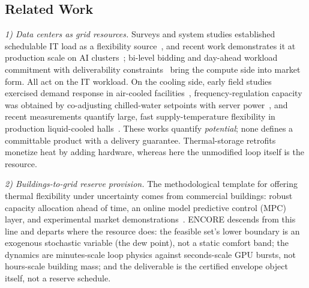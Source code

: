 \vspace{-4mm}
\subsection{Related Work}
\label{subsec:related}

\textit{1) Data centers as grid resources.} Surveys and system studies
established schedulable IT load as a flexibility
source~\cite{takci2025datacentres,wierman2014opportunities}, and recent work
demonstrates it at production scale on AI
clusters~\cite{colangelo2025phoenix,acun2026flexibility}; bi-level bidding and
day-ahead workload commitment with deliverability
constraints~\cite{chen2023bilevel,fan2026commitment} bring the compute side
into market form. All act on the IT workload. On the cooling side, early
field studies exercised demand response in air-cooled
facilities~\cite{ghatikar2012demand}, frequency-regulation capacity was
obtained by co-adjusting chilled-water setpoints with server
power~\cite{fu2020assessments}, and recent measurements quantify large, fast
supply-temperature flexibility in production liquid-cooled
halls~\cite{gheni2026liquid}. These works quantify \emph{potential}; none
defines a committable product with a delivery guarantee. Thermal-storage
retrofits~\cite{oh2025rtes,zhang2025carnot,ravi2026prosumer} monetize heat by
adding hardware, whereas here the unmodified loop itself is the resource.

\textit{2) Buildings-to-grid reserve provision.} The methodological template
for offering thermal flexibility under uncertainty comes from commercial
buildings: robust capacity allocation ahead of time, an online model
predictive control (MPC) layer, and experimental market
demonstrations~\cite{vrettos2016scheduling,vrettos2016robust,gorecki2017experimental}.
ENCORE descends from this line and departs where the resource does: the
feasible set's lower boundary is an exogenous stochastic variable (the dew
point), not a static comfort band; the dynamics are minutes-scale
loop physics against seconds-scale GPU bursts, not hours-scale
building mass; and the deliverable is the certified envelope object itself,
not a reserve schedule.

